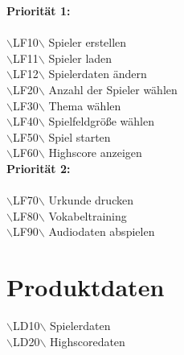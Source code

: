 \noindent \textbf{Priorität 1:}\\\\
\noindent$\backslash$LF10$\backslash$ \hspace{15 mm}Spieler erstellen \\
\noindent$\backslash$LF11$\backslash$ \hspace{15 mm}Spieler laden\\ %
\noindent$\backslash$LF12$\backslash$ \hspace{15 mm}Spielerdaten ändern\\  %
\noindent$\backslash$LF20$\backslash$ \hspace{15 mm}Anzahl der Spieler wählen\\
\noindent$\backslash$LF30$\backslash$ \hspace{15 mm}Thema wählen\\
\noindent$\backslash$LF40$\backslash$ \hspace{15 mm}Spielfeldgröße wählen\\
\noindent$\backslash$LF50$\backslash$ \hspace{15 mm}Spiel starten\\
\noindent $\backslash$LF60$\backslash$ \hspace{15 mm}Highscore anzeigen\\

\noindent \textbf{Priorität 2:}\\ \\
\noindent$\backslash$LF70$\backslash$ \hspace{15 mm}Urkunde drucken\\
\noindent$\backslash$LF80$\backslash$ \hspace{15 mm}Vokabeltraining\\
\noindent$\backslash$LF90$\backslash$ \hspace{15 mm}Audiodaten abspielen \\ 


\section{Produktdaten} %
$\backslash$LD10$\backslash$ \hspace{15 mm}Spielerdaten \\
\noindent $\backslash$LD20$\backslash$ \hspace{15 mm}Highscoredaten \\ \\

